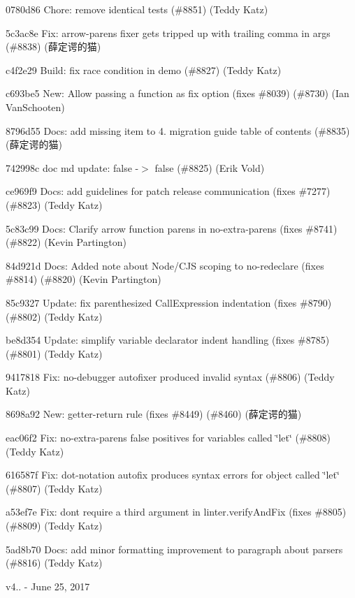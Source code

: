 \begin{DoxyItemize}
\item 0780d86 Chore\+: remove identical tests (\#8851) (Teddy Katz)
\item 5c3ac8e Fix\+: arrow-\/parens fixer gets tripped up with trailing comma in args (\#8838) (薛定谔的猫)
\item c4f2e29 Build\+: fix race condition in demo (\#8827) (Teddy Katz)
\item c693be5 New\+: Allow passing a function as {\ttfamily fix} option (fixes \#8039) (\#8730) (Ian Van\+Schooten)
\item 8796d55 Docs\+: add missing item to 4. migration guide table of contents (\#8835) (薛定谔的猫)
\item 742998c doc md update\+: false -\/$>$ {\ttfamily false} (\#8825) (Erik Vold)
\item ce969f9 Docs\+: add guidelines for patch release communication (fixes \#7277) (\#8823) (Teddy Katz)
\item 5c83c99 Docs\+: Clarify arrow function parens in no-\/extra-\/parens (fixes \#8741) (\#8822) (Kevin Partington)
\item 84d921d Docs\+: Added note about Node/\+C\+JS scoping to no-\/redeclare (fixes \#8814) (\#8820) (Kevin Partington)
\item 85c9327 Update\+: fix parenthesized Call\+Expression indentation (fixes \#8790) (\#8802) (Teddy Katz)
\item be8d354 Update\+: simplify variable declarator indent handling (fixes \#8785) (\#8801) (Teddy Katz)
\item 9417818 Fix\+: no-\/debugger autofixer produced invalid syntax (\#8806) (Teddy Katz)
\item 8698a92 New\+: getter-\/return rule (fixes \#8449) (\#8460) (薛定谔的猫)
\item eac06f2 Fix\+: no-\/extra-\/parens false positives for variables called \char`\"{}let\char`\"{} (\#8808) (Teddy Katz)
\item 616587f Fix\+: dot-\/notation autofix produces syntax errors for object called \char`\"{}let\char`\"{} (\#8807) (Teddy Katz)
\item a53ef7e Fix\+: don\textquotesingle{}t require a third argument in linter.\+verify\+And\+Fix (fixes \#8805) (\#8809) (Teddy Katz)
\item 5ad8b70 Docs\+: add minor formatting improvement to paragraph about parsers (\#8816) (Teddy Katz)
\end{DoxyItemize}

v4.. -\/ June 25, 2017


